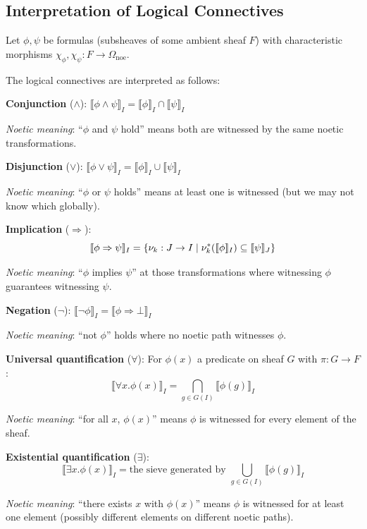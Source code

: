 \subsection{Interpretation of Logical Connectives}
\label{subsec:logical-connectives}

Let $\phi, \psi$ be formulas (subsheaves of some ambient sheaf $F$) with
characteristic morphisms $\chi_\phi, \chi_\psi : F \to \Omega_{\mathrm{noe}}$.

\begin{definition}
\label{def:noetic-logical-ops}
The logical connectives are interpreted as follows:

\textbf{Conjunction} ($\land$): $\llbracket \phi \land \psi \rrbracket_I = \llbracket \phi \rrbracket_I \cap \llbracket \psi \rrbracket_I$

\emph{Noetic meaning}: ``$\phi$ and $\psi$ hold'' means both are witnessed by
the same noetic transformations.

\textbf{Disjunction} ($\lor$): $\llbracket \phi \lor \psi \rrbracket_I = \llbracket \phi \rrbracket_I \cup \llbracket \psi \rrbracket_I$

\emph{Noetic meaning}: ``$\phi$ or $\psi$ holds'' means at least one is witnessed
(but we may not know which globally).

\textbf{Implication} ($\Rightarrow$):
\[
  \llbracket \phi \Rightarrow \psi \rrbracket_I = \{\nu_{k} : J \to I \mid
    \nu_{k}^*(\llbracket \phi \rrbracket_I) \subseteq \llbracket \psi \rrbracket_J\}
\]

\emph{Noetic meaning}: ``$\phi$ implies $\psi$'' at those transformations where
witnessing $\phi$ guarantees witnessing $\psi$.

\textbf{Negation} ($\neg$): $\llbracket \neg \phi \rrbracket_I = \llbracket \phi \Rightarrow \bot \rrbracket_I$

\emph{Noetic meaning}: ``not $\phi$'' holds where no noetic path witnesses $\phi$.

\textbf{Universal quantification} ($\forall$): For $\phi(x)$ a predicate on
sheaf $G$ with $\pi : G \to F$:
\[
  \llbracket \forall x. \phi(x) \rrbracket_I = \bigcap_{g \in G(I)} \llbracket \phi(g) \rrbracket_I
\]

\emph{Noetic meaning}: ``for all $x$, $\phi(x)$'' means $\phi$ is witnessed
for every element of the sheaf.

\textbf{Existential quantification} ($\exists$):
\[
  \llbracket \exists x. \phi(x) \rrbracket_I = \text{the sieve generated by }
    \bigcup_{g \in G(I)} \llbracket \phi(g) \rrbracket_I
\]

\emph{Noetic meaning}: ``there exists $x$ with $\phi(x)$'' means $\phi$ is
witnessed for at least one element (possibly different elements on different
noetic paths).
\end{definition}

